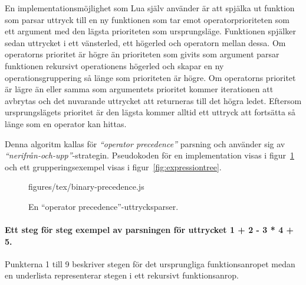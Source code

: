 En implementationsmöjlighet som Lua själv använder är att spjälka ut
funktion som parsar uttryck till en ny funktionen som tar emot
operatorprioriteten som ett argument med den lägsta prioriteten som
ursprungsläge. Funktionen spjälker sedan uttrycket i ett vänsterled, ett
högerled och operatorn mellan dessa. Om operatorns prioritet är högre än
prioriteten som givits som argument parsar funktionen rekursivt operationens
högerled och skapar en ny operationsgruppering så länge som prioriteten är
högre. Om operatorns prioritet är lägre än eller samma som argumentets
prioritet kommer iterationen att avbrytas och det nuvarande uttrycket att
returneras till det högra ledet. Eftersom ursprungslägets prioritet är den
lägsta kommer alltid ett uttryck att fortsätta så länge som en operator kan
hittas.

Denna algoritm kallas för \textit{``operator precedence''} parsning och
använder sig av \textit{``nerifrån-och-upp''}-strategin. Pseudokoden för en
implementation visas i figur~\ref{fig:binprecedence} och ett
grupperingsexempel visas i figur~\ref{fig:expressiontree}.

\begin{figure}[ht]
    {figures/tex/binary-precedence.js}
  \caption{En ``operator precedence''-uttrycksparser.}
  \label{fig:binprecedence}
\end{figure}

\paragraph{Ett steg för steg exempel av parsningen för uttrycket 1 + 2 - 3 * 4
+ 5.}
\hfill

Punkterna 1 till 9 beskriver stegen för det ursprungliga funktionsanropet medan
en underlista representerar stegen i ett rekursivt funktionsanrop.

